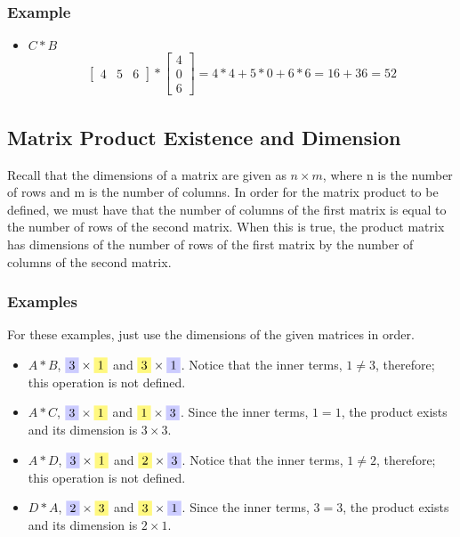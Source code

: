 \documentclass[14pt]{extarticle}
\newcommand{\yhighlight}[1]{%
	\colorbox{yellow!50}{$\displaystyle#1$}}
\newcommand{\bhighlight}[1]{%
	\colorbox{blue!20}{$\displaystyle#1$}}
\begin{document}
\subsubsection*{Example}
\begin{itemize}
	\item $C * B$
\begin{align*}
	\begin{bmatrix}
		4 & 5 & 6
	\end{bmatrix} *
	\begin{bmatrix}
		4 \\
		0 \\
		6
	\end{bmatrix} =
	4*4 + 5*0 + 6*6 = 16+ 36 = 52
\end{align*}
\end{itemize}

\subsection{Matrix Product Existence and Dimension}
Recall that the dimensions of a matrix are given as $n\times m$, where n is the number of rows and m is the number of columns. In order for the matrix product to be defined, we must have that the \colorbox{yellow!50}{number of columns of the first} matrix is equal to the \colorbox{yellow!50}{number of rows of the second} matrix. When this is true, the product matrix has dimensions of the \colorbox{blue!20}{number of rows of the first} matrix by the \colorbox{blue!20}{number of columns of the second} matrix.
\subsubsection*{Examples}
For these examples, just use the dimensions of the given matrices in order.
\begin{itemize}
	\item $A * B$, $\bhighlight{3}\times \yhighlight{1}$ and $\yhighlight{3} \times \bhighlight{1}$. Notice that the inner terms, $1\neq 3$, therefore; this operation is not defined.
	\item $A * C$, $\bhighlight{3} \times \yhighlight{1}$ and  $\yhighlight{1}\times \bhighlight{3}$. Since the inner terms, $1 = 1$, the product exists and its dimension is $3\times 3$.
	\item $A * D$, $\bhighlight{3}\times \yhighlight{1}$ and $\yhighlight{2} \times \bhighlight{3}$. Notice that the inner terms, $1\neq 2$, therefore; this operation is not defined.
	\item $D * A$, $\bhighlight{2} \times \yhighlight{3}$ and  $\yhighlight{3}\times \bhighlight{1}$. Since the inner terms, $3 = 3$, the product exists and its dimension is $2\times 1$.
\end{itemize}
\end{document}
